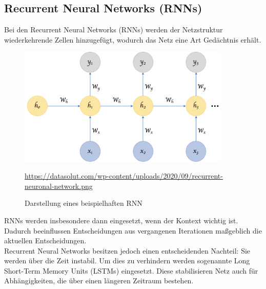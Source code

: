 \subsection{Recurrent Neural Networks (RNNs)}

	Bei den Recurrent Neural Networks (RNNs) werden der Netzstruktur wiederkehrende Zellen hinzugefügt, wodurch das Netz eine Art  Gedächtnis erhält. \cite{datasolut4} \\ 
	
	\begin{figure}[H]
		\centering
		\includegraphics[width=0.9\textwidth]{kapitel3/images/rnn.png}
		\caption{Darstellung eines beispielhaften RNN}
		\vspace{0.2cm}
		\quelle\url{https://datasolut.com/wp-content/uploads/2020/09/recurrent-neuronal-network.png}
	\end{figure}
	
	
	RNNs werden insbesondere dann eingesetzt, wenn der Kontext wichtig ist. Dadurch beeinflussen Entscheidungen aus vergangenen Iterationen maßgeblich die aktuellen Entscheidungen. \cite{datasolut4} \\
	
	Recurrent Neural Networks besitzen jedoch einen entscheidenden Nachteil: Sie werden über die Zeit instabil. Um dies zu verhindern werden sogenannte Long Short-Term Memory Units (LSTMs) eingesetzt. Diese stabilisieren Netz auch für Abhängigkeiten, die über einen längeren Zeitraum bestehen. \cite{datasolut4}





